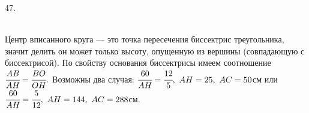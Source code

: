 47. \begin{figure}[ht!]
\end{figure}\\
Центр вписанного круга --- это точка пересечения биссектрис треугольника, значит делить он может только высоту, опущенную из вершины (совпадающую с биссектрисой). По свойству основания биссектрисы имеем соотношение $\cfrac{AB}{AH}=\cfrac{BO}{OH}.$ Возможны два случая: $\cfrac{60}{AH}=\cfrac{12}{5},\ AH=25,\ AC=50$см или
$\cfrac{60}{AH}=\cfrac{5}{12},\ AH=144,\ AC=288$см.\\
